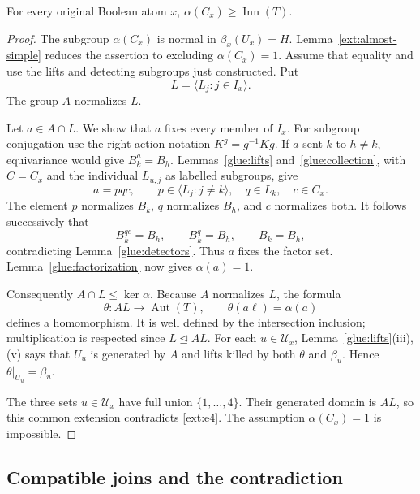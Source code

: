 \begin{proposition}\label{glue:atom-cores}
For every original Boolean atom $x$,
$\alpha(C_x)\ge\operatorname{Inn}(T)$.
\end{proposition}
\begin{proof}
The subgroup $\alpha(C_x)$ is normal in
$\beta_x(U_x)=H$.  Lemma~\ref{ext:almost-simple} reduces the assertion
to excluding $\alpha(C_x)=1$.  Assume that equality and use the lifts
and detecting subgroups just constructed.  Put
\[
                         L=\langle L_j:j\in I_x\rangle.
\]
The group $A$ normalizes $L$.

Let $a\in A\cap L$.  We show that $a$ fixes every member of $I_x$.
For subgroup conjugation use the right-action notation
$K^g=g^{-1}Kg$.  If $a$ sent $k$ to $h\ne k$, equivariance would give
$B_k^a=B_h$.  Lemmas~\ref{glue:lifts} and~\ref{glue:collection}, with
$C=C_x$ and the individual $L_{u,j}$ as labelled subgroups, give
\[
        a=pqc,\qquad
        p\in\langle L_j:j\ne k\rangle,\quad q\in L_k,\quad c\in C_x.
\]
The element $p$ normalizes $B_k$, $q$ normalizes $B_h$, and $c$
normalizes both.  It follows successively that
\[
                 B_k^{qc}=B_h,
       \qquad B_k^q=B_h,
       \qquad B_k=B_h,
\]
contradicting Lemma~\ref{glue:detectors}.  Thus $a$ fixes the factor
set.  Lemma~\ref{glue:factorization} now gives $\alpha(a)=1$.

Consequently $A\cap L\le\ker\alpha$.  Because $A$ normalizes $L$,
the formula
\[
              \theta:AL\longrightarrow\operatorname{Aut}(T),
                       \qquad \theta(a\ell)=\alpha(a)
\]
defines a homomorphism.  It is well defined by the intersection
inclusion; multiplication is respected since $L\trianglelefteq AL$.
For each $u\in\mathcal U_x$, Lemma~\ref{glue:lifts}(iii),(v) says that
$U_u$ is generated by $A$ and lifts killed by both $\theta$ and
$\beta_u$.  Hence $\theta|_{U_u}=\beta_u$.

The three sets $u\in\mathcal U_x$ have full union
$\{1,\ldots,4\}$.  Their generated domain is $AL$, so this common
extension contradicts \ref{ext:e4}.  The assumption
$\alpha(C_x)=1$ is impossible.
\end{proof}

\subsection{Compatible joins and the contradiction}

